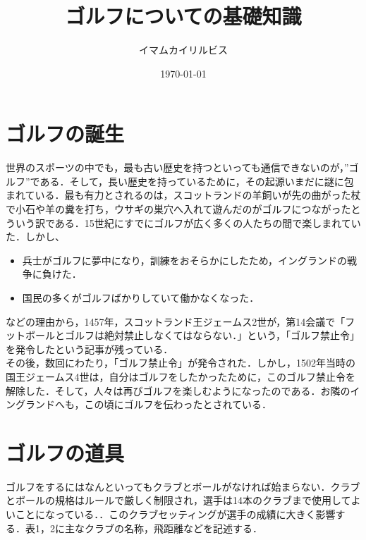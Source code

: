 \documentclass[a4j, twocolumn]{jarticle}
\begin{document}
\title{ゴルフについての基礎知識}
\author{イマムカイリルビス}
\date{\today}

\maketitle

\section{ゴルフの誕生}

世界のスポーツの中でも，最も古い歴史を持つといっても通信できないのが，”ゴルフ”である．そして，長い歴史を持っているために，その起源いまだに謎に包まれている．最も有力とされるのは，スコットランドの羊飼いが先の曲がった杖で小石や羊の糞を打ち，ウサギの巣穴へ入れて遊んだのがゴルフにつながったとういう訳である．15世紀にすでにゴルフが広く多くの人たちの間で楽しまれていた．しかし、

\begin{itemize}
    \item 兵士がゴルフに夢中になり，訓練をおそらかにしたため，イングランドの戦争に負けた．
    \item 国民の多くがゴルフばかりしていて働かなくなった．
\end{itemize}

などの理由から，1457年，スコットランド王ジェームス2世が，第14会議で「フットボールとゴルフは絶対禁止しなくてはならない．」という，「ゴルフ禁止令」を発令したという記事が残っている．\cite{bib1}\\

その後，数回にわたり，「ゴルフ禁止令」が発令された．しかし，1502年当時の国王ジェームス4世は，自分はゴルフをしたかったために，このゴルフ禁止令を解除した．そして，人々は再びゴルフを楽しむようになったのである．お隣のイングランドへも，この頃にゴルフを伝わったとされている．\cite{bib1}\\


\section{ゴルフの道具}

ゴルフをするにはなんといってもクラブとボールがなければ始まらない．クラブとボールの規格はルールで厳しく制限され，選手は14本のクラブまで使用してよいことになっている．\cite{bib2}．このクラブセッティングが選手の成績に大きく影響する．表1，2に主なクラブの名称，飛距離などを記述する．
\end{document}
